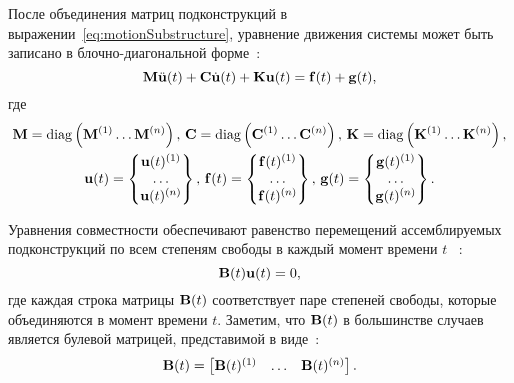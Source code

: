После объединения матриц подконструкций в выражении~\eqref{eq:motionSubstructure}, уравнение движения системы может быть записано в блочно-диагональной форме~\cite{lib:coupling:Klerk}:
\begin{equation}
	\mathbf{M} \ddot{\mathbf{u}}(t) + \mathbf{C} \dot{\mathbf{u}}(t) + \mathbf{K} \mathbf{u}(t) = \mathbf{f}(t) + \mathbf{g}(t), \label{eq:motionAssembly}
\end{equation} 
где 
\begin{equation*}
	\begin{gathered}
		\mathbf{M} = \operatorname{diag} \left( \mathbf{M} ^ {(1)} \hdots \mathbf{M} ^ {(n)} \right), \,
		\mathbf{C} = \operatorname{diag} \left( \mathbf{C} ^ {(1)} \hdots \mathbf{C} ^ {(n)} \right), \,
		\mathbf{K} = \operatorname{diag} \left( \mathbf{K} ^ {(1)} \hdots \mathbf{K} ^ {(n)} \right), \\
		\mathbf{u}(t) = 
		\begin{Bmatrix}
			\mathbf{u}(t) ^ {(1)} \\
			\hdots \\
			\mathbf{u}(t) ^ {(n)}
		\end{Bmatrix}, \,
		\mathbf{f}(t) = 
		\begin{Bmatrix}
			\mathbf{f}(t) ^ {(1)} \\
			\hdots \\
			\mathbf{f}(t) ^ {(n)}
		\end{Bmatrix}, \,
		\mathbf{g}(t) = 
		\begin{Bmatrix}
			\mathbf{g}(t) ^ {(1)} \\
			\hdots \\
			\mathbf{g}(t) ^ {(n)}
		\end{Bmatrix}.
	\end{gathered}
\end{equation*}

Уравнения совместности обеспечивают равенство перемещений ассемблируемых подконструкций по всем степеням свободы в каждый момент времени $ t $ ~\cite{lib:coupling:Klerk}:
\begin{equation}
	\mathbf{B}(t) \mathbf{u}(t) = 0, \label{eq:compatibilityCoupling}
\end{equation}
где каждая строка матрицы $ \mathbf{B}(t) $ соответствует паре степеней свободы, которые объединяются в момент времени $ t $. Заметим, что $ \mathbf{B}(t) $ в большинстве случаев является булевой матрицей, представимой в виде~\cite{lib:coupling:Brunetti}:
\begin{equation}
	\mathbf{B}(t) = 
	\begin{bmatrix}
		\mathbf{B}(t) ^ {(1)} & \hdots & \mathbf{B}(t) ^ {(n)}
	\end{bmatrix}.
\end{equation}

